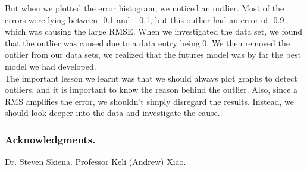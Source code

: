 \documentclass[runningheads]{llncs}
\begin{document}
\begin{itemize}
But when we plotted the error histogram, we noticed an outlier. Most of the errors were lying between -0.1 and +0.1, but this outlier had an error of -0.9 which was causing the large RMSE. When we investigated the data set, we found that the outlier was caused due to a data entry being 0. We then removed the outlier from our data sets, we realized that the futures model was by far the best model we had developed. \\

The important lesson we learnt was that we should always plot graphs to detect outliers, and it is important to know the reason behind the outlier. Also, since a RMS amplifies the error, we shouldn't simply disregard the results. Instead, we should look deeper into the data and investigate the cause. 
\end{itemize}



\subsubsection*{Acknowledgments.} Dr. Steven Skiena. Professor Keli (Andrew) Xiao.
\end{document}

